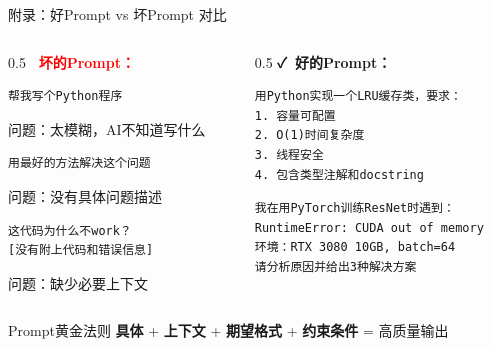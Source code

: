\documentclass[aspectratio=169,11pt]{beamer}
\begin{document}
\begin{frame}[fragile]{附录：好Prompt vs 坏Prompt 对比}
    \begin{columns}
        \begin{column}{0.5\textwidth}
            \textbf{\textcolor{red}{\faTimes\ 坏的Prompt：}}
            \begin{lstlisting}[basicstyle=\ttfamily\scriptsize]
帮我写个Python程序
            \end{lstlisting}
            {\scriptsize 问题：太模糊，AI不知道写什么}
            
            \vspace{0.3cm}
            \begin{lstlisting}[basicstyle=\ttfamily\scriptsize]
用最好的方法解决这个问题
            \end{lstlisting}
            {\scriptsize 问题：没有具体问题描述}
            
            \vspace{0.3cm}
            \begin{lstlisting}[basicstyle=\ttfamily\scriptsize]
这代码为什么不work？
[没有附上代码和错误信息]
            \end{lstlisting}
            {\scriptsize 问题：缺少必要上下文}
        \end{column}
        \begin{column}{0.5\textwidth}
            \textbf{\textcolor{green!60!black}{\faCheck\ 好的Prompt：}}
            \begin{lstlisting}[basicstyle=\ttfamily\scriptsize]
用Python实现一个LRU缓存类，要求：
1. 容量可配置
2. O(1)时间复杂度
3. 线程安全
4. 包含类型注解和docstring
            \end{lstlisting}
            
            \vspace{0.2cm}
            \begin{lstlisting}[basicstyle=\ttfamily\scriptsize]
我在用PyTorch训练ResNet时遇到：
RuntimeError: CUDA out of memory
环境：RTX 3080 10GB, batch=64
请分析原因并给出3种解决方案
            \end{lstlisting}
        \end{column}
    \end{columns}
    
    \vspace{0.3cm}
    \begin{block}{Prompt黄金法则}
        \textbf{具体} + \textbf{上下文} + \textbf{期望格式} + \textbf{约束条件} = 高质量输出
    \end{block}
\end{frame}
\end{document}
